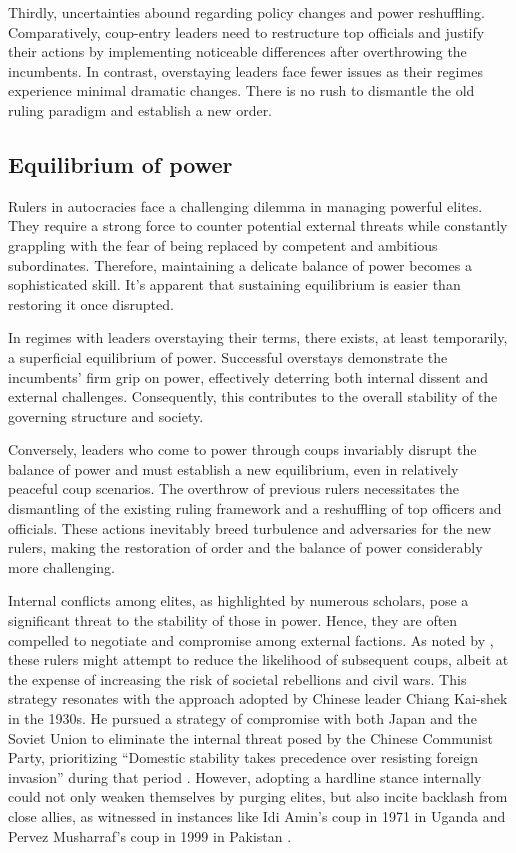\documentclass[
  12pt,
  a4paper,
  12pt]{article}
\begin{document}
Thirdly, uncertainties abound regarding policy changes and power
reshuffling. Comparatively, coup-entry leaders need to restructure top
officials and justify their actions by implementing noticeable
differences after overthrowing the incumbents. In contrast, overstaying
leaders face fewer issues as their regimes experience minimal dramatic
changes. There is no rush to dismantle the old ruling paradigm and
establish a new order.

\hypertarget{equilibrium-of-power}{%
\subsection{Equilibrium of power}\label{equilibrium-of-power}}

Rulers in autocracies face a challenging dilemma in managing powerful
elites. They require a strong force to counter potential external
threats while constantly grappling with the fear of being replaced by
competent and ambitious subordinates. Therefore, maintaining a delicate
balance of power becomes a sophisticated skill. It's apparent that
sustaining equilibrium is easier than restoring it once disrupted.

In regimes with leaders overstaying their terms, there exists, at least
temporarily, a superficial equilibrium of power. Successful overstays
demonstrate the incumbents' firm grip on power, effectively deterring
both internal dissent and external challenges. Consequently, this
contributes to the overall stability of the governing structure and
society.

Conversely, leaders who come to power through coups invariably disrupt
the balance of power and must establish a new equilibrium, even in
relatively peaceful coup scenarios. The overthrow of previous rulers
necessitates the dismantling of the existing ruling framework and a
reshuffling of top officers and officials. These actions inevitably
breed turbulence and adversaries for the new rulers, making the
restoration of order and the balance of power considerably more
challenging.

Internal conflicts among elites, as highlighted by numerous scholars,
pose a significant threat to the stability of those in power. Hence,
they are often compelled to negotiate and compromise among external
factions. As noted by \citet{roessler2011}, these rulers might attempt
to reduce the likelihood of subsequent coups, albeit at the expense of
increasing the risk of societal rebellions and civil wars. This strategy
resonates with the approach adopted by Chinese leader Chiang Kai-shek in
the 1930s. He pursued a strategy of compromise with both Japan and the
Soviet Union to eliminate the internal threat posed by the Chinese
Communist Party, prioritizing ``Domestic stability takes precedence over
resisting foreign invasion'' during that period \citep{chu1999chiang}.
However, adopting a hardline stance internally could not only weaken
themselves by purging elites, but also incite backlash from close
allies, as witnessed in instances like Idi Amin's coup in 1971 in Uganda
and Pervez Musharraf's coup in 1999 in Pakistan \citep{sudduth2017a}.
\end{document}
